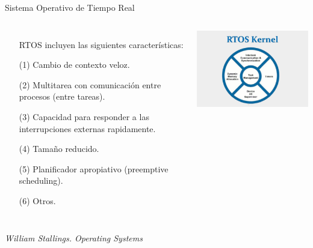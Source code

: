 \documentclass[8pt,aspectratio=169,compress]{beamer}
\begin{document}
\begin{frame}{Sistema Operativo de Tiempo Real}

   \begin{columns}[onlytextwidth,T]
     \column{\dimexpr\linewidth-50mm-5mm}

\begin{itemize}
  \item[RTOS] incluyen las siguientes características:

\bigskip
(1) Cambio de contexto veloz.

\bigskip
(2) Multitarea con comunicación entre procesos (entre tareas).

\bigskip
(3) Capacidad para responder a las interrupciones externas rapidamente.

\bigskip
(4) Tamaño reducido.

\bigskip
(5) Planificador apropiativo (preemptive scheduling).

\bigskip
(6) Otros.

\bigskip
\bigskip
\end{itemize}
      \column{70mm}
    \includegraphics[width=80mm]{images/rtos.jpg}

    \end{columns}
\textit{William Stallings. Operating Systems}

\end{frame}
\end{document}
